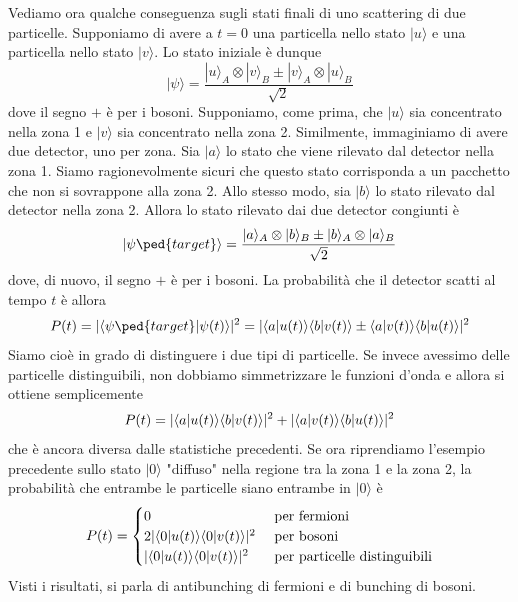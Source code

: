 \documentclass[a4paper, 11pt]{article}
\renewcommand{\ket}[1]{| #1\rangle}
\begin{document}
Vediamo ora qualche conseguenza sugli stati finali di uno scattering di due particelle. Supponiamo di avere a $t=0$ una particella nello stato $\ket{u}$ e una particella nello stato $\ket{v}$. Lo stato iniziale è dunque
\[\ket{\psi}=\frac{\ket{u}_A\otimes\ket{v}_B\pm\ket{v}_A\otimes\ket{u}_B}{\sqrt{2}}\]
dove il segno $+$ è per i bosoni. Supponiamo, come prima, che $\ket{u}$ sia concentrato nella zona 1 e $\ket{v}$ sia concentrato nella zona 2. Similmente, immaginiamo di avere due detector, uno per zona. Sia $\ket{a}$ lo stato che viene rilevato dal detector nella zona 1. Siamo ragionevolmente sicuri che questo stato corrisponda a un pacchetto che non si sovrappone alla zona 2. Allo stesso modo, sia $\ket{b}$ lo stato rilevato dal detector nella zona 2. Allora lo stato rilevato dai due detector congiunti è
\[\ket{\psi\ped{target}}=\frac{\ket{a}_A\otimes\ket{b}_B\pm\ket{b}_A\otimes\ket{a}_B}{\sqrt{2}}\]
dove, di nuovo, il segno $+$ è per i bosoni. La probabilità che il detector scatti al tempo $t$ è allora
\[P(t)=|\braket{\psi\ped{target}}{\psi(t)}|^2=|\braket{a}{u(t)}\braket{b}{v(t)}\pm\braket{a}{v(t)}\braket{b}{u(t)}|^2\]
Siamo cioè in grado di distinguere i due tipi di particelle. Se invece avessimo delle particelle distinguibili, non dobbiamo simmetrizzare le funzioni d'onda e allora si ottiene semplicemente
\[P(t)=|\langle a\vert u(t)\rangle\langle b\vert v(t)\rangle|^2+|\langle a\vert v(t)\rangle\langle b\vert u(t)\rangle|^2\]
che è ancora diversa dalle statistiche precedenti. Se ora riprendiamo l'esempio precedente sullo stato $\ket{0}$ "diffuso" nella regione tra la zona 1 e la zona 2, la probabilità che entrambe le particelle siano entrambe in $\ket{0}$ è
\[P(t)=\begin{cases}0&\textrm{ per fermioni}\\
2|\langle 0\vert u(t)\rangle\langle 0\vert v(t)\rangle|^2&\textrm{ per bosoni}\\
|\langle 0\vert u(t)\rangle\langle 0\vert v(t)\rangle|^2&\textrm{ per particelle distinguibili}
\end{cases}\]
Visti i risultati, si parla di antibunching di fermioni e di bunching di bosoni.
\end{document}

